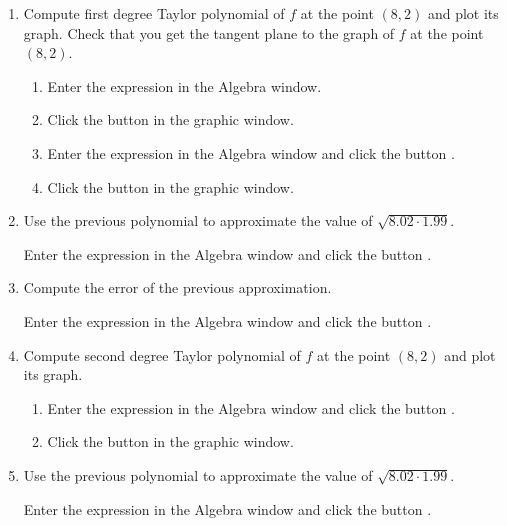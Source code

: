 \begin{enumerate}[leftmargin=*]
\begin{enumerate}
\item Compute first degree Taylor polynomial of $f$ at the point $(8,2)$ and plot its graph.
Check that you get the tangent plane to the graph of $f$ at the point $(8,2)$.
\begin{indication}
\begin{enumerate}
\item Enter the expression \command{[8,2,f(8,2)]} in the Algebra window. 
\item Click the button  in the graphic window.
\item Enter the expression  in the Algebra window and click the button .
\item Click the button  in the graphic window.
\end{enumerate}
\end{indication}

\item Use the previous polynomial to approximate the value of $\sqrt{8.02\cdot 1.99}$.
\begin{indication}
Enter the expression  in the Algebra window and click the button .
\end{indication}

\item Compute the error of the previous approximation. 
\begin{indication}
Enter the expression  in the Algebra window and click the button .
\end{indication}

\item Compute second degree Taylor polynomial of $f$ at the point $(8,2)$ and plot its graph.
\begin{indication}
\begin{enumerate}
\item Enter the expression  in the Algebra window and click the button .
\item Click the button  in the graphic window.
\end{enumerate}
\end{indication}

\item Use the previous polynomial to approximate the value of $\sqrt{8.02\cdot 1.99}$.
\begin{indication}
Enter the expression  in the Algebra window and click the button .
\end{indication}


\end{enumerate}
\end{enumerate}
